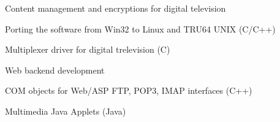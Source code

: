 \documentclass[a4paper]{deedy-resume} %
\begin{document}
\begin{minipage}[t]{0.66\textwidth}
	Content management and encryptions for digital television
	\begin{tightitemize}
		\item Porting the software from Win32 to Linux and TRU64 UNIX (C/C++)
		\item Multiplexer driver for digital trelevision (C)
	\end{tightitemize}

\sectionspace %


	Web backend development
	\begin{tightitemize}
		\item COM objects for Web/ASP FTP, POP3, IMAP interfaces (C++)
		\item Multimedia Java Applets (Java)
	\end{tightitemize}

\sectionspace %

\end{minipage}%
\hfill


\newpage %
\bigskip
\end{document}

